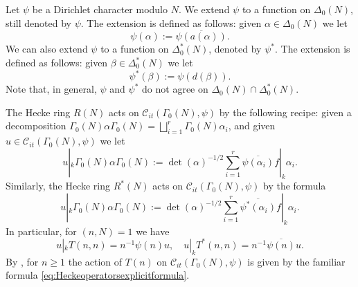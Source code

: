 \documentclass{article}
\theoremstyle{named}
\newcommand{\C}{\mathcal{C}}
\begin{document}
Let $\psi$ be a Dirichlet character modulo $N$. We extend $\psi$ to a function on $\Delta_0(N)$, still denoted by $\psi$. The extension is defined as follows: given $\alpha \in \Delta_0(N)$ we let  
\begin{equation*}
    \psi(\alpha) := \overline{\psi(a(\alpha))}.
\end{equation*}
We can also extend $\psi$ to a function on $\Delta^*_0(N)$, denoted by $\psi^*$. The extension is defined as follows: given $\beta \in \Delta_0^*(N)$ we let  
\begin{equation*}
    \psi^*(\beta) := \psi(d(\beta)).
\end{equation*}
Note that, in general, $\psi$ and $\psi^*$ do not agree on $\Delta_0(N) \cap \Delta_0^*(N)$. 

The Hecke ring $R(N)$ acts on $\C_{it}(\Gamma_0(N), \psi)$ by the following recipe: given a decomposition $\Gamma_0(N)\alpha\Gamma_0(N) = \bigsqcup_{i = 1}^r \Gamma_0(N)\alpha_i$, and given $u \in \C_{it}(\Gamma_0(N), \psi)$ we let 
\begin{equation*}
    u|_k \Gamma_0(N)\alpha\Gamma_0(N) := \det(\alpha)^{-1/2}\sum_{i = 1}^r \overline{\psi(\alpha_i)}f|_k \alpha_i.
\end{equation*} 
Similarly, the Hecke ring $R^*(N)$ acts on $\C_{it}(\Gamma_0(N), \psi)$ by the formula 
\begin{equation*}
    u|_k \Gamma_0(N)\alpha\Gamma_0(N) := \det(\alpha)^{-1/2}\sum_{i = 1}^r \overline{\psi^*(\alpha_i)}f|_k \alpha_i.
\end{equation*} 
In particular, for $(n, N) = 1$ we have 
\begin{equation*}
    u|_k T(n, n) = n^{-1}\psi(n) u, \quad u|_k T^*(n, n) = n^{-1}\overline{\psi(n)} u.
\end{equation*}
By \cite[Equation (4.5.26)]{miyake}, for $n \geq 1$ the action of $T(n)$ on $\C_{it}(\Gamma_0(N), \psi)$ is given by the familiar formula \eqref{eq:Heckeoperatorsexplicitformula}.
\end{document}
